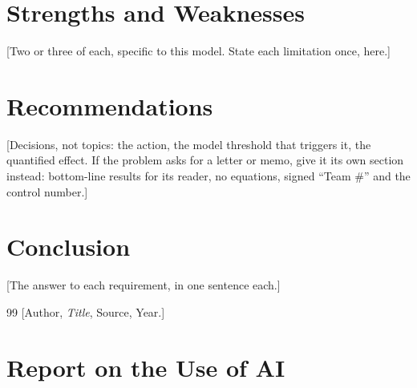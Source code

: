 \documentclass[12pt]{article}
\begin{document}
\section{Strengths and Weaknesses}
[Two or three of each, specific to this model. State each limitation once, here.]

\section{Recommendations}
[Decisions, not topics: the action, the model threshold that triggers it, the quantified
effect. If the problem asks for a letter or memo, give it its own section instead:
bottom-line results for its reader, no equations, signed ``Team \#'' and the control number.]

\section{Conclusion}
[The answer to each requirement, in one sentence each.]

\begin{thebibliography}{99}
 [Author, \emph{Title}, Source, Year.]
\end{thebibliography}

\clearpage
{}
\section*{Report on the Use of AI}
\end{document}
